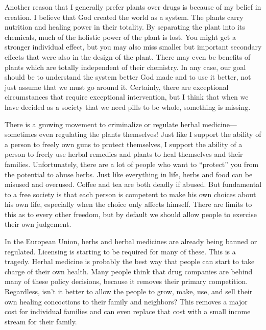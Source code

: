\begin{infonote}
Another reason that I generally prefer plants over drugs is because of
my belief in creation. I believe that God created the world as a
system. The plants carry nutrition and healing power in their totality.
By separating the plant into its chemicals, much of the holistic power
of the plant is lost. You might get a stronger individual effect, but
you may also miss smaller but important secondary effects that were
also in the design of the plant. There may even be benefits of plants
which are totally independent of their chemistry.  In any case, our
goal should be to understand the system better God made and to use it
better, not just assume that we must go around it. Certainly, there are
exceptional circumstances that require exceptional intervention, but I
think that when we have decided as a society that we need pills to be
whole, something is missing.
\end{infonote}

\begin{policynote}
There is a growing movement to criminalize or regulate herbal
medicine—sometimes even regulating the plants themselves!  Just like I
support the ability of a person to freely own guns to protect
themselves, I support the ability of a person to freely use herbal
remedies and plants to heal themselves and their families.
Unfortunately, there are a lot of people who want to
``protect'' you from the potential to abuse
herbs. Just like everything in life, herbs and food can be misused and
overused. Coffee and tea are both deadly if abused. But fundamental to
a free society is that each person is competent to make
his own choices about
his own life,
especially when the choice only affects himself.  There are limits to
this as to every other freedom, but by default we should allow people
to exercise their own judgement.

In the European Union, herbs and herbal medicines are already being
banned or regulated. Licensing is starting to be required for many of
these. This is a tragedy. Herbal medicine is probably the best way that
people can start to take charge of their own health. Many people think
that drug companies are behind many of these policy decisions, because
it removes their primary competition.
Regardless,
isn’t it better to
allow the people to
grow, make, use, and sell their own healing concoctions to their family
and neighbors?  This removes a major cost
for individual
families and can even replace
that
cost with a small
income stream for their family.
\end{policynote}

